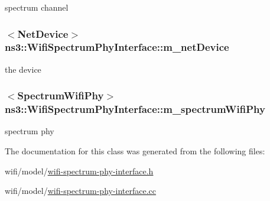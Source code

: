 spectrum channel 

\subsubsection[{\texorpdfstring{m\+\_\+net\+Device}{m_netDevice}}]{$<${\bf Net\+Device}$>$ ns3\+::\+Wifi\+Spectrum\+Phy\+Interface\+::m\+\_\+net\+Device\hspace{0.3cm}{\ttfamily [private]}}\hypertarget{classns3_1_1WifiSpectrumPhyInterface_a62ccaf33755afa7dc2db72f36523d3b6}{}\label{classns3_1_1WifiSpectrumPhyInterface_a62ccaf33755afa7dc2db72f36523d3b6}


the device 

\subsubsection[{\texorpdfstring{m\+\_\+spectrum\+Wifi\+Phy}{m_spectrumWifiPhy}}]{$<${\bf Spectrum\+Wifi\+Phy}$>$ ns3\+::\+Wifi\+Spectrum\+Phy\+Interface\+::m\+\_\+spectrum\+Wifi\+Phy\hspace{0.3cm}{\ttfamily [private]}}\hypertarget{classns3_1_1WifiSpectrumPhyInterface_ae3f3c7b1e293fe041972e71fdcc39630}{}\label{classns3_1_1WifiSpectrumPhyInterface_ae3f3c7b1e293fe041972e71fdcc39630}


spectrum phy 



The documentation for this class was generated from the following files\+:\begin{DoxyCompactItemize}
\item 
wifi/model/\hyperlink{wifi-spectrum-phy-interface_8h}{wifi-\/spectrum-\/phy-\/interface.\+h}\item 
wifi/model/\hyperlink{wifi-spectrum-phy-interface_8cc}{wifi-\/spectrum-\/phy-\/interface.\+cc}\end{DoxyCompactItemize}

